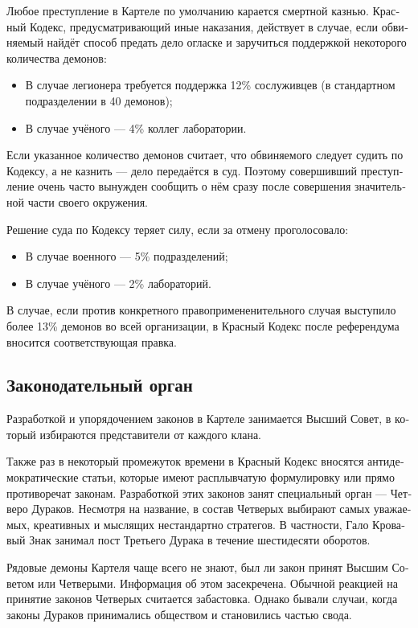 \documentclass[a4paper,12pt,fleqn]{book}\usepackage{polyglossia}\setdefaultlanguage[babelshorthands=true]{russian}\setotherlanguage{english}\defaultfontfeatures{Ligatures=TeX,Mapping=tex-text}\usepackage{xcolor}\newcommand{\ml}[3]{#2}
\begin{document}
{Любое преступление в Картеле по умолчанию карается смертной казнью.
Красный Кодекс, предусматривающий иные наказания, действует в случае, если обвиняемый найдёт способ предать дело огласке и заручиться поддержкой некоторого количества демонов:

\begin{itemize}
\item В случае легионера требуется поддержка 12\% сослуживцев (в стандартном подразделении в 40 демонов);
\item В случае учёного --- 4\% коллег лаборатории.
\end{itemize}

Если указанное количество демонов считает, что обвиняемого следует судить по Кодексу, а не казнить --- дело передаётся в суд.
Поэтому совершивший преступление очень часто вынужден сообщить о нём сразу после совершения значительной части своего окружения.

Решение суда по Кодексу теряет силу, если за отмену проголосовало:

\begin{itemize}
\item В случае военного --- 5\% подразделений;
\item В случае учёного --- 2\% лабораторий.
\end{itemize}

В случае, если против конкретного правопримененительного случая выступило более 13\% демонов во всей организации, в Красный Кодекс после референдума вносится соответствующая правка.

\subsection{Законодательный орган}

Разработкой и упорядочением законов в Картеле занимается Высший Совет, в который избираются представители от каждого клана.

Также раз в некоторый промежуток времени в Красный Кодекс вносятся антидемократические статьи, которые имеют расплывчатую формулировку или прямо противоречат законам.
Разработкой этих законов занят специальный орган --- Четверо Дураков.
Несмотря на название, в состав Четверых выбирают самых уважаемых, креативных и мыслящих нестандартно стратегов.
В частности, Гало Кровавый Знак занимал пост Третьего Дурака в течение шестидесяти оборотов.

Рядовые демоны Картеля чаще всего не знают, был ли закон принят Высшим Советом или Четверыми.
Информация об этом засекречена.
Обычной реакцией на принятие законов Четверых считается забастовка.
Однако бывали случаи, когда законы Дураков принимались обществом и становились частью свода.

}
\end{document}

